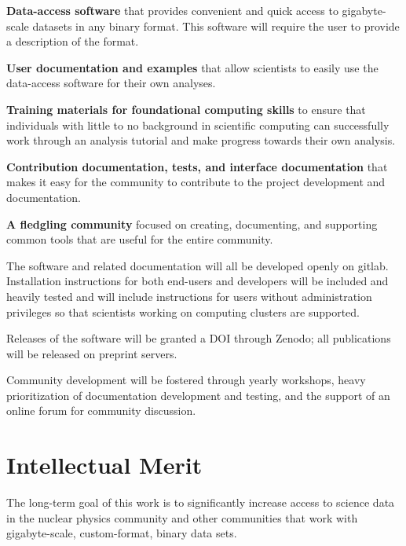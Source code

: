 \textbf{Data-access software} that provides convenient and quick access to gigabyte-scale datasets in any binary format.  This software will require the user to provide a description of the format.

\textbf{User documentation and examples} that allow scientists to easily use the data-access software for their own analyses.

\textbf{Training materials for foundational computing skills} to ensure that individuals with little to no background in scientific computing can successfully work through an analysis tutorial and make progress towards their own analysis.

\textbf{Contribution documentation, tests, and interface documentation} that makes it easy for the community to contribute to the project development and documentation.

\textbf{A fledgling community} focused on creating, documenting, and supporting common tools that are useful for the entire community.

The software and related documentation will all be developed openly on gitlab.  Installation instructions for both end-users and developers will be included and heavily tested and will include instructions for users without administration privileges so that scientists working on computing clusters are supported.

Releases of the software will be granted a DOI through Zenodo; all publications will be released on preprint servers.

Community development will be fostered through yearly workshops, heavy prioritization of documentation development and testing, and the support of an online forum for community discussion.

\section{Intellectual Merit}

The long-term goal of this work is to significantly increase access to science data in the nuclear physics community and other communities that work with gigabyte-scale, custom-format, binary data sets.  

